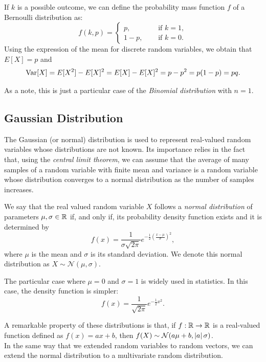 If $k$ is a possible outcome, we can define
the probability mass function $f$ of a Bernoulli distribution as:
$$
f(k,p) = 
\begin{cases} 
p, \quad & \text{ if } k=1,\\
1-p, \quad & \text{ if } k = 0.
\end{cases}
$$
Using the expression of the mean for discrete random variables, we obtain that $E[X] = p$ and 
$$
\operatorname*{Var}[X] = E[X^2] - E[X]^2 = E[X] - E[X]^2 = p-p^2 = p(1-p) = pq.
$$

As a note, this is just a particular case of the \emph{Binomial distribution} with $n=1$.

\subsection{Gaussian Distribution}

The Gaussian (or normal) distribution is used to represent real-valued random variables whose distributions are not known.
Its importance relies in the fact that, using the \emph{central limit theorem}, we can assume that the average of many samples of
a random variable with finite mean and variance is a random variable whose distribution converges to a normal distribution as the number of samples increases.

\begin{ndef}
We say that the real valued random variable $X$ follows a \emph{normal distribution} of parameters $\mu,\sigma\in \mathbb{R}$ if, and only if,
its probability density function exists and it is determined by
\begin{equation}\label{gaussian:function}
f(x) = \frac{1}{\sigma \sqrt{2\pi}}e^{-\frac{1}{2}\left( \frac{x - \mu}{\sigma}\right)^2},
\end{equation}
where $\mu$ is the mean and $\sigma$ is its standard deviation. We denote this normal distribution as $X \sim \mathcal N (\mu,\sigma)$.
\end{ndef}

The particular case where $\mu = 0$ and $\sigma = 1$ is widely used in statistics. In this case, the density function is simpler:
\[
f(x) = \frac{1}{\sqrt{2\pi}}e^{-\frac{1}{2}x^2}.
\]

A remarkable property of these distributions is that, if $f : \mathbb{R} \to \mathbb{R}$ is a real-valued function defined 
as $f(x) = ax+b$, then $f(X) \sim \mathcal N (a\mu + b, \left\lvert a\right\rvert \sigma)$.\\

In the same way that we extended random variables to random vectors, we can extend the normal distribution to a multivariate
random distribution.


